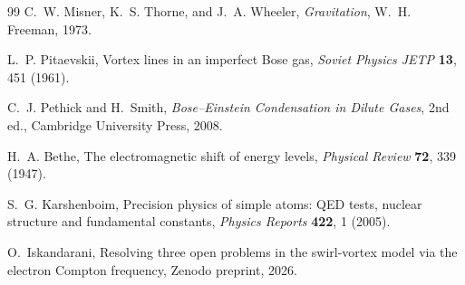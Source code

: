 \documentclass[11pt, a4paper]{article}
\begin{document}
\begin{thebibliography}{99}
C.~W. Misner, K.~S. Thorne, and J.~A. Wheeler,
\textit{Gravitation},
W.~H. Freeman, 1973.

L.~P. Pitaevskii,
Vortex lines in an imperfect Bose gas,
\textit{Soviet Physics JETP} \textbf{13}, 451 (1961).

C.~J. Pethick and H.~Smith,
\textit{Bose--Einstein Condensation in Dilute Gases}, 2nd ed.,
Cambridge University Press, 2008.

H.~A. Bethe,
The electromagnetic shift of energy levels,
\textit{Physical Review} \textbf{72}, 339 (1947).

S.~G. Karshenboim,
Precision physics of simple atoms: QED tests, nuclear structure and
fundamental constants,
\textit{Physics Reports} \textbf{422}, 1 (2005).

O.~Iskandarani,
Resolving three open problems in the swirl-vortex model via the
electron Compton frequency,
Zenodo preprint, 2026.

\end{thebibliography}
\end{document}
